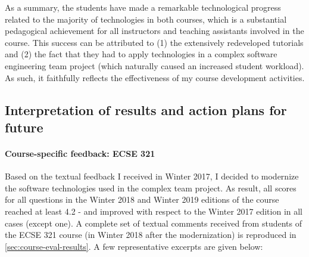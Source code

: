 
As a summary, the students have made a remarkable technological progress related to the majority of technologies in both 
courses, which is a substantial pedagogical achievement for all instructors and teaching assistants involved in the course. 
This success can be attributed to (1) the extensively redeveloped tutorials and (2) the fact that they had to apply 
technologies in a complex software engineering team project (which naturally caused an increased student workload).  As 
such, it faithfully reflects the effectiveness of my course development activities. 

\subsection{Interpretation of results and action plans for future}

\paragraph{Course-specific feedback: ECSE 321}
Based on the textual feedback I received in Winter 2017, I decided to modernize the software technologies used in the complex team project. As result, all scores for all questions in the Winter 2018 and Winter 2019 editions of the course reached at least 4.2 - and improved with respect to the Winter 2017 edition in all cases (except one). 
A complete set of textual comments received from students of the ECSE 321 course (in Winter 2018 after the modernization) is reproduced in \autoref{sec:course-eval-results}. A few representative excerpts are given below:

